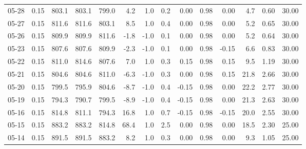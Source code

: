 \begin{threeparttable}
{\begin{tabular}{lrrrrrrrrrrrrr}
  05-28 &     0.15 & 803.1 & 803.1 & 799.0 &        4.2 &                      1.0 &                 0.2 &       0.00 &      0.98 &           0.00 &              4.7 &            0.60 &                  30.00 \\
  05-27 &     0.15 & 811.6 & 811.6 & 803.1 &        8.5 &                      1.0 &                 0.4 &       0.00 &      0.98 &           0.00 &              5.2 &            0.65 &                  30.00 \\
  05-26 &     0.15 & 809.9 & 809.9 & 811.6 &       -1.8 &                     -1.0 &                 0.1 &       0.00 &      0.98 &           0.00 &              5.2 &            0.64 &                  30.00 \\
  05-23 &     0.15 & 807.6 & 807.6 & 809.9 &       -2.3 &                     -1.0 &                 0.1 &       0.00 &      0.98 &          -0.15 &              6.6 &            0.83 &                  30.00 \\
  05-22 &     0.15 & 811.0 & 814.6 & 807.6 &        7.0 &                      1.0 &                 0.3 &       0.15 &      0.98 &           0.15 &              9.5 &            1.19 &                  30.00 \\
  05-21 &     0.15 & 804.6 & 804.6 & 811.0 &       -6.3 &                     -1.0 &                 0.3 &       0.00 &      0.98 &           0.15 &             21.8 &            2.66 &                  30.00 \\
  05-20 &     0.15 & 799.5 & 795.9 & 804.6 &       -8.7 &                     -1.0 &                 0.4 &      -0.15 &      0.98 &           0.00 &             22.2 &            2.77 &                  30.00 \\
  05-19 &     0.15 & 794.3 & 790.7 & 799.5 &       -8.9 &                     -1.0 &                 0.4 &      -0.15 &      0.98 &           0.00 &             21.3 &            2.63 &                  30.00 \\
  05-16 &     0.15 & 814.8 & 811.1 & 794.3 &       16.8 &                      1.0 &                 0.7 &      -0.15 &      0.98 &          -0.15 &             20.0 &            2.55 &                  30.00 \\
  05-15 &     0.15 & 883.2 & 883.2 & 814.8 &       68.4 &                      1.0 &                 2.5 &       0.00 &      0.98 &           0.00 &             18.5 &            2.30 &                  25.00 \\
  05-14 &     0.15 & 891.5 & 891.5 & 883.2 &        8.2 &                      1.0 &                 0.3 &       0.00 &      0.98 &           0.00 &              9.3 &            1.05 &                  25.00 \\

\end{tabular}}
\end{threeparttable}
